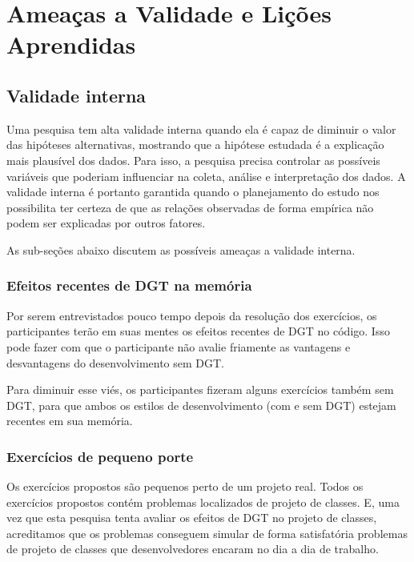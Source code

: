 \chapter{Ameaças a Validade e Lições Aprendidas}
\label{cap:ameacas}

\section{Validade interna}

Uma pesquisa tem alta validade interna quando ela é capaz de diminuir o valor das hipóteses alternativas, mostrando
que a hipótese estudada é a explicação mais plausível dos dados. Para isso, a pesquisa precisa controlar as possíveis
variáveis que poderiam influenciar na coleta, análise e interpretação dos dados. A validade interna é portanto
garantida quando o planejamento do estudo nos possibilita ter certeza de que as relações observadas de
forma empírica não podem ser explicadas por outros fatores.

As sub-seções abaixo discutem as possíveis ameaças a validade interna.

\subsection{Efeitos recentes de DGT na memória}

Por serem entrevistados pouco tempo depois da resolução dos exercícios, os participantes terão
em suas mentes os efeitos recentes de DGT no código. Isso pode fazer com que o participante
não avalie friamente as vantagens e desvantagens do desenvolvimento sem DGT. 

Para diminuir esse viés, os participantes fizeram alguns exercícios também
sem DGT, para que ambos os estilos de desenvolvimento (com e sem DGT) estejam
recentes em sua memória.

\subsection{Exercícios de pequeno porte}

Os exercícios propostos são pequenos perto de um projeto real. Todos os exercícios propostos contém
problemas localizados de projeto de classes. E, uma vez que esta pesquisa tenta avaliar os efeitos de DGT no projeto de classes, 
acreditamos que os problemas conseguem simular de forma satisfatória
problemas de projeto de classes que desenvolvedores encaram no dia a dia de trabalho.

